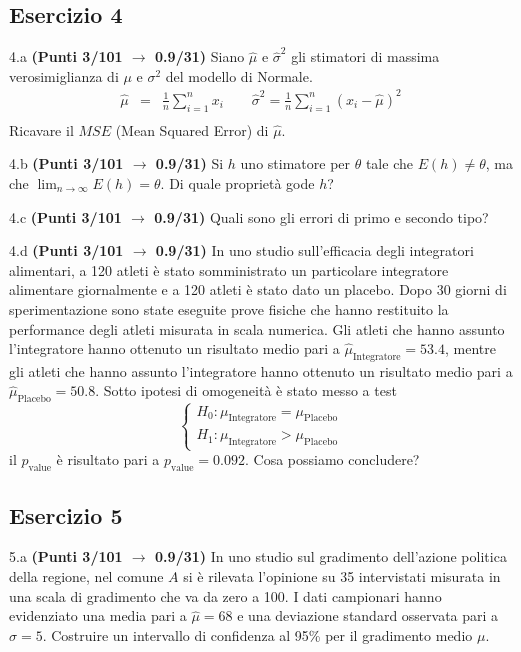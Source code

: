 \documentclass[
  11pt,
]{book}
\theoremstyle{mytheoremstyle}
\theoremstyle{mydefstyle}
\begin{document}
\subsection{Esercizio 4}\label{esercizio-4-20}

4.a \textbf{(Punti 3/101 \(\rightarrow\) 0.9/31)} Siano \(\hat \mu\) e \(\hat\sigma^2\) gli stimatori di massima verosimiglianza di \(\mu\) e \(\sigma^2\) del modello di Normale.
\begin{eqnarray*}
  \hat\mu &=&  \frac 1n\sum_{i=1}^nx_i \qquad \hat\sigma^2 =  \frac 1n\sum_{i=1}^n(x_i-\hat\mu)^2\\
\end{eqnarray*}
Ricavare il \(MSE\) (Mean Squared Error) di \(\hat\mu\).

4.b \textbf{(Punti 3/101 \(\rightarrow\) 0.9/31)} Si \(h\) uno stimatore per \(\theta\) tale che \(E(h)\ne\theta\), ma che \(\lim_{n\to\infty}E(h)=\theta\). Di quale proprietà gode \(h\)?

4.c \textbf{(Punti 3/101 \(\rightarrow\) 0.9/31)} Quali sono gli errori di primo e secondo tipo?

4.d \textbf{(Punti 3/101 \(\rightarrow\) 0.9/31)} In uno studio sull'efficacia degli integratori alimentari, a 120 atleti è stato somministrato un particolare integratore alimentare giornalmente e a 120 atleti è stato dato un placebo. Dopo 30 giorni di sperimentazione sono state eseguite prove fisiche che hanno restituito la performance degli atleti misurata in scala numerica. Gli atleti che hanno assunto l'integratore hanno ottenuto un risultato medio pari a \(\hat\mu_\text{Integratore}=53.4\), mentre gli atleti che hanno assunto l'integratore hanno ottenuto un risultato medio pari a \(\hat\mu_\text{Placebo}=50.8\).
Sotto ipotesi di omogeneità è stato messo a test
\[
\begin{cases}
H_0:\mu_\text{Integratore}=\mu_\text{Placebo}\\
H_1:\mu_\text{Integratore}>\mu_\text{Placebo}
\end{cases}
\]
il \(p_\text{value}\) è risultato pari a \(p_\text{value}=0.092\). Cosa possiamo concludere?

\subsection{Esercizio 5}\label{esercizio-5-19}

5.a \textbf{(Punti 3/101 \(\rightarrow\) 0.9/31)} In uno studio sul gradimento dell'azione politica della regione, nel comune \(A\) si è rilevata l'opinione su 35 intervistati misurata in una scala di gradimento che va da zero a 100. I dati campionari hanno evidenziato una media pari a \(\hat\mu=68\) e una deviazione standard osservata pari a \(\hat\sigma=5\).
Costruire un intervallo di confidenza al 95\% per il gradimento medio \(\mu\).
\end{document}
